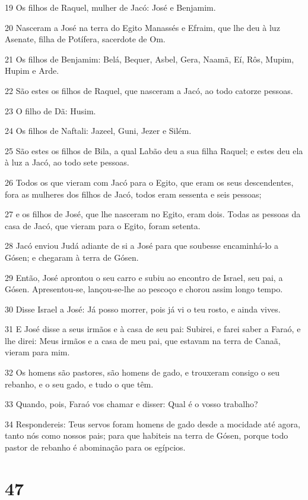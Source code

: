 \par 19 Os filhos de Raquel, mulher de Jacó: José e Benjamim.
\par 20 Nasceram a José na terra do Egito Manassés e Efraim, que lhe deu à luz Asenate, filha de Potífera, sacerdote de Om.
\par 21 Os filhos de Benjamim: Belá, Bequer, Asbel, Gera, Naamã, Eí, Rôs, Mupim, Hupim e Arde.
\par 22 São estes os filhos de Raquel, que nasceram a Jacó, ao todo catorze pessoas.
\par 23 O filho de Dã: Husim.
\par 24 Os filhos de Naftali: Jazeel, Guni, Jezer e Silém.
\par 25 São estes os filhos de Bila, a qual Labão deu a sua filha Raquel; e estes deu ela à luz a Jacó, ao todo sete pessoas.
\par 26 Todos os que vieram com Jacó para o Egito, que eram os seus descendentes, fora as mulheres dos filhos de Jacó, todos eram sessenta e seis pessoas;
\par 27 e os filhos de José, que lhe nasceram no Egito, eram dois. Todas as pessoas da casa de Jacó, que vieram para o Egito, foram setenta.
\par 28 Jacó enviou Judá adiante de si a José para que soubesse encaminhá-lo a Gósen; e chegaram à terra de Gósen.
\par 29 Então, José aprontou o seu carro e subiu ao encontro de Israel, seu pai, a Gósen. Apresentou-se, lançou-se-lhe ao pescoço e chorou assim longo tempo.
\par 30 Disse Israel a José: Já posso morrer, pois já vi o teu rosto, e ainda vives.
\par 31 E José disse a seus irmãos e à casa de seu pai: Subirei, e farei saber a Faraó, e lhe direi: Meus irmãos e a casa de meu pai, que estavam na terra de Canaã, vieram para mim.
\par 32 Os homens são pastores, são homens de gado, e trouxeram consigo o seu rebanho, e o seu gado, e tudo o que têm.
\par 33 Quando, pois, Faraó vos chamar e disser: Qual é o vosso trabalho?
\par 34 Respondereis: Teus servos foram homens de gado desde a mocidade até agora, tanto nós como nossos pais; para que habiteis na terra de Gósen, porque todo pastor de rebanho é abominação para os egípcios.

\chapter{47}

